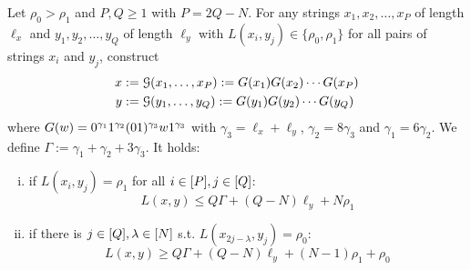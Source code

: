 \begin{lemma}
\label{lem:1-2vs1gadget}
Let $\rho_0 > \rho_1$ and $P, Q \geq 1$ with $P = 2Q - N$.
For any strings $x_1, x_2, \ldots, x_P$ of length $\ell_x$ and $y_1, y_2, \ldots, y_Q$ of length $\ell_y$ with $L(x_i, y_j) \in \{\rho_0, \rho_1\}$ for all pairs of strings $x_i$ and $y_j$, construct
\begin{align*}
	x &:= \mathcal{G}(x_1, \ldots, x_P) := G(x_1)G(x_2) \cdots G(x_P)\\
	y &:= \mathcal{G}(y_1, \ldots, y_Q) := G(y_1)G(y_2) \cdots G(y_Q)
\end{align*}
where $G(w) = 0^{\gamma_1}1^{\gamma_2}(01)^{\gamma_3}w1^{\gamma_3}$ with $\gamma_3 = \ell_x + \ell_y$, $\gamma_2 = 8\gamma_3$ and $\gamma_1 = 6\gamma_2$.
We define $\Gamma := \gamma_1 + \gamma_2 + 3\gamma_3$.
It holds:
%
\begin{enumerate}[(i)]
\item\label{lem:1-2vs1gadget:not-ortho} if $L(x_i, y_j) = \rho_1$ for all $i \in [P], j \in [Q]$: 
\[ 
L(x,y) \leq Q\Gamma + (Q-N)\ell_y + N\rho_1
\]
\item\label{lem:1-2vs1gadget:ortho} if there is $j \in [Q], \lambda \in [N]$ s.t. $L(x_{2j-\lambda}, y_j) = \rho_0$: 
\[
L(x,y) \geq Q\Gamma + (Q-N)\ell_y + (N-1)\rho_1 + \rho_0
\]


\end{enumerate}
%

\end{lemma}
